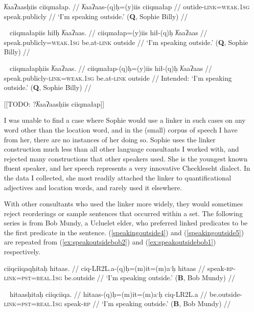\ex \label{speakingoutside1}
\begingl
\glpreamble ƛ̓aaʔaasḥiis ciiqmałap. //
\gla ƛ̓aaʔaas-(q)ḥ=(y)iis ciiqmałap //
\glb outide-\textsc{link}=\textsc{weak.1sg} speak.publicly //
\glft `I'm speaking outside.' (\textbf{Q}, Sophie Billy) //
\endgl
\xe

\ex~ \label{speakingoutside2}
\begingl
\glpreamble ciiqmałapiis hiłḥ ƛ̓aaʔaas. //
\gla ciiqmałap=(y)iis hił-(q)ḥ ƛ̓aaʔaas //
\glb speak.publicly=\textsc{weak.1sg} be.at-\textsc{link} outside //
\glft `I'm speaking outside.' (\textbf{Q}, Sophie Billy) //
\endgl
\xe

\ex~ \label{*speakingoutside3}
\begingl
\glpreamble *ciiqmałapḥiis ƛ̓aaʔaas. //
\gla ciiqmałap-(q)ḥ=(y)iis hił-(q)ḥ ƛ̓aaʔaas //
\glb speak.publicly-\textsc{link}=\textsc{weak.1sg} be.at-\textsc{link} outside //
\glft Intended: `I'm speaking outside.' (\textbf{Q}, Sophie Billy) //
\endgl
\xe

[[TODO: ?ƛ̓aaʔaasḥiis ciiqmałap]]

I was unable to find a case where Sophie would use a linker in such cases on any word other than the location word, and in the (small) corpus of speech I have from her, there are no instances of her doing so. Sophie uses the linker construction much less than all other language consultants I worked with, and rejected many constructions that other speakers used. She is the youngest known fluent speaker, and her speech represents a very innovative Checkleseht dialect. In the data I collected, she most readily attached the linker to quantificational adjectives and location words, and rarely used it elsewhere.

With other consultants who used the linker more widely, they would sometimes reject reorderings or sample sentences that occurred within a set. The following series is from Bob Mundy, a Ucluelet elder, who preferred linked predicates to be the first predicate in the sentence. (\ref{speakingoutside4}) and (\ref{speakingoutside5}) are repeated from (\ref{ex:speakoutsidebob2}) and (\ref{ex:speakoutsidebob1}) respectively.

\ex \label{speakingoutside4}
\begingl
\glpreamble ciiqciiqaqḥitaḥ hitaas. //
\gla ciq-LR2L.a-(q)ḥ=(m)it=(m)aˑḥ hitaas //
\glb speak-\textsc{rp}-\textsc{link}=\textsc{pst}=\textsc{real.1sg} be.outside //
\glft `I'm speaking outside.' (\textbf{B}, Bob Mundy) //
\endgl
\xe

\ex~ \label{speakingoutside5}
\begingl
\glpreamble hitaasḥitaḥ ciiqciiqa. //
\gla hitaas-(q)ḥ=(m)it=(m)aˑḥ ciq-LR2L.a //
\glb be.outside-\textsc{link}=\textsc{pst}=\textsc{real.1sg} speak-\textsc{rp} //
\glft `I'm speaking outside.' (\textbf{B}, Bob Mundy) //
\endgl
\xe

